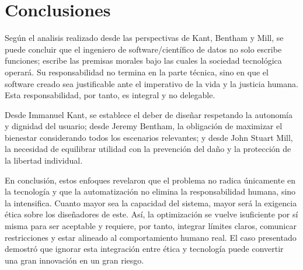 \section{Conclusiones}
Según el analisis realizado desde las perspectivas de Kant, Bentham y Mill, se puede concluir que el ingeniero de software/científico de datos no solo escribe funciones; escribe las premisas morales bajo las cuales la sociedad tecnológica operará. Su responsabilidad no termina en la parte técnica, sino en que el software creado sea justificable ante el imperativo de la vida  y la justicia humana. Esta responsabilidad, por tanto, es integral y no delegable. 


Desde Immanuel Kant, se establece el deber de diseñar respetando la autonomía y dignidad del usuario; desde Jeremy Bentham, la obligación de maximizar el bienestar considerando todos los escenarios relevantes; y desde John Stuart Mill, la necesidad de equilibrar utilidad con la prevención del daño y la protección de la libertad individual.

En conclusión, estos enfoques revelaron que el problema no radica únicamente en la tecnología y que la automatización no elimina la responsabilidad humana, sino la intensifica. Cuanto mayor sea la capacidad del sistema, mayor será la exigencia ética sobre los diseñadores de este. Así, la optimización se vuelve isuficiente por sí misma para ser aceptable y requiere, por tanto, integrar límites claros, comunicar restricciones y estar alineado al comportamiento humano real.
El caso presentado demostró que ignorar esta integración entre ética y tecnología puede convertir una gran innovación en un gran riesgo.